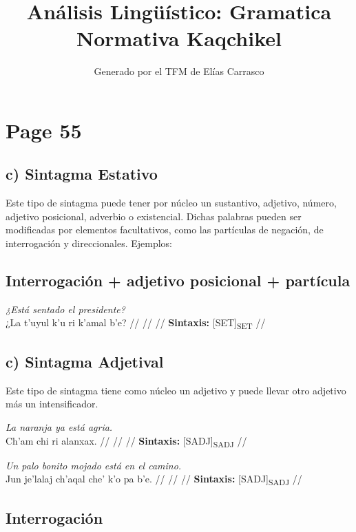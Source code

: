 \documentclass{article}%
\title{Análisis Lingüístico: Gramatica Normativa Kaqchikel}%
\author{Generado por el TFM de Elías Carrasco}%
\begin{document}
%
\normalsize%
\maketitle%
\section{Page 55}%
\label{sec:Page55}%
\subsection{c) Sintagma Estativo}%
\label{subsec:c)SintagmaEstativo}%

%
Este tipo de sintagma puede tener por núcleo un sustantivo, adjetivo, número, adjetivo %
posicional, adverbio o existencial. Dichas palabras pueden ser modificadas por %
elementos facultativos, como las partículas de negación, de interrogación y direccionales. %
Ejemplos: %
\subsection{Interrogación + adjetivo posicional + partícula}%
\label{subsec:Interrogacin+adjetivoposicional+partcula}%

%
\par\medskip%
\ex
\textit{¿Está sentado el presidente?} \\
\begingl
\gla ¿La t’uyul k’u ri k’amal b’e? //
\glb  //
\glc  //
\glft \textbf{Sintaxis:} [SET]\textsubscript{SET} //
\endgl
\xe
%
\medskip%
\subsection{c) Sintagma Adjetival}%
\label{subsec:c)SintagmaAdjetival}%

%
Este tipo de sintagma tiene como núcleo un adjetivo y puede llevar otro adjetivo más un %
intensificador. %
\par\medskip%
\ex
\textit{La naranja ya está agria.} \\
\begingl
\gla Ch'am chi ri alanxax. //
\glb  //
\glc  //
\glft \textbf{Sintaxis:} [SADJ]\textsubscript{SADJ} //
\endgl
\xe
%
\medskip%
\par\medskip%
\ex
\textit{Un palo bonito mojado está en el camino.} \\
\begingl
\gla Jun je’lalaj ch’aqal che' k'o pa b’e. //
\glb  //
\glc  //
\glft \textbf{Sintaxis:} [SADJ]\textsubscript{SADJ} //
\endgl
\xe
%
\medskip%
\subsection{Interrogación}%
\label{subsec:Interrogacin}%
\end{document}
